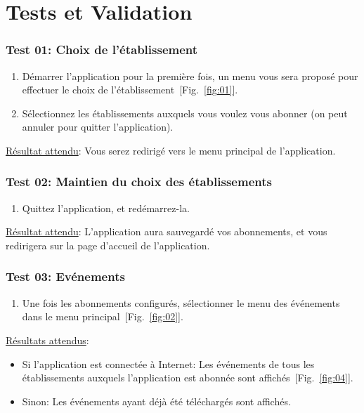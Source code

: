\chapter{Tests et Validation}
  
  \subsection{Test 01: Choix de l'établissement}
    \begin{enumerate}
    \item Démarrer l'application pour la première fois, un menu vous sera proposé pour effectuer le choix de l'établissement~[Fig.~\ref{fig:01}].
    \item Sélectionnez les établissements auxquels vous voulez vous abonner (on peut annuler pour quitter l'application).
    \end{enumerate}

    \underline{Résultat attendu}: Vous serez redirigé vers le menu principal de l'application.

  \subsection{Test 02: Maintien du choix des établissements}
    \begin{enumerate}
    \item Quittez l'application, et redémarrez-la.
    \end{enumerate}

    \underline{Résultat attendu}: L'application aura sauvegardé vos abonnements, et vous redirigera sur la page d'accueil de l'application.

  \subsection{Test 03: Evénements}
    \begin{enumerate}
    \item Une fois les abonnements configurés, sélectionner le menu des événements dans le menu principal~[Fig.~\ref{fig:02}].
    \end{enumerate}

    \underline{Résultats attendus}:
    \begin{itemize}
    \item Si l'application est connectée à Internet: Les événements de tous les établissements auxquels l'application est abonnée sont affichés~[Fig.~\ref{fig:04}].
    \item Sinon: Les événements ayant déjà été téléchargés sont affichés.
    \end{itemize}

